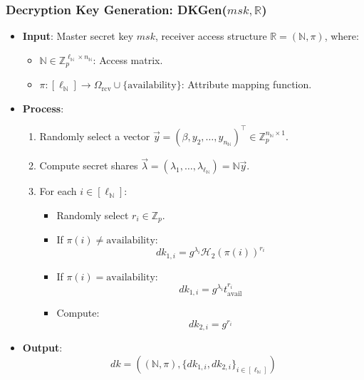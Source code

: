 \documentclass[runningheads]{llncs}
\begin{document}
\subsubsection{Decryption Key Generation: DKGen($msk, \mathbb{R}$)}
\begin{itemize}
    \item \textbf{Input}: Master secret key $msk$, receiver access structure $\mathbb{R} = (\mathbb{N}, \pi)$, where:
    \begin{itemize}
        \item $\mathbb{N} \in \mathbb{Z}_p^{\ell_\mathbb{N} \times n_\mathbb{N}}$: Access matrix.
        \item $\pi: [\ell_\mathbb{N}] \to \Omega_{\mathrm{rcv}} \cup \{\text{availability}\}$: Attribute mapping function.
    \end{itemize}
    \item \textbf{Process}:
    \begin{enumerate}
        \item Randomly select a vector $\vec{y} = (\beta, y_2, \ldots, y_{n_\mathbb{N}})^\top \in \mathbb{Z}_p^{n_\mathbb{N} \times 1}$.
        \item Compute secret shares $\vec{\lambda} = (\lambda_1, \ldots, \lambda_{\ell_\mathbb{N}}) = \mathbb{N} \vec{y}$.
        \item For each $i \in [\ell_\mathbb{N}]$:
        \begin{itemize}
            \item Randomly select $r_i \in \mathbb{Z}_p$.
            \item If $\pi(i) \neq \text{availability}$:
            \[
            dk_{1,i} = g^{\lambda_i} \mathcal{H}_2(\pi(i))^{r_i}
            \]
            \item If $\pi(i) = \text{availability}$:
            \[
            dk_{1,i} = g^{\lambda_i} t_{\text{avail}}^{r_i}
            \]
            \item Compute:
            \[
            dk_{2,i} = g^{r_i}
            \]
        \end{itemize}
    \end{enumerate}
    \item \textbf{Output}:
    \[
    dk = ((\mathbb{N}, \pi), \{dk_{1,i}, dk_{2,i}\}_{i \in [\ell_\mathbb{N}]})
    \]
\end{itemize}
\end{document}
